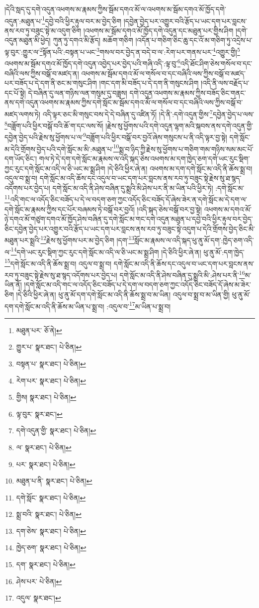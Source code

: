 །དེའི་སླད་དུ་དགེ་འདུན་འཕགས་མ་རྣམས་ཀྱིས་སྦོམ་དགའ་མོ་ལ་འཕགས་མ་སྦོམ་དགའ་མོ་ཁྱོད་དགེ་འདུན་:མཐུན་པ་\footnote{མཐུན་པར་  ཅོ་ནེ། }དབྱེ་བའི་ཕྱིར་རྟུལ་བར་མ་བྱེད་ཅིག །དབྱེན་བྱེད་པར་འགྱུར་བའི་རྩོད་པ་ཡང་དག་པར་བླངས་ནས་རབ་ཏུ་བཟུང་སྟེ་མ་འདུག་ཅིག །འཕགས་མ་སྦོམ་དགའ་མོ་ཁྱོད་དགེ་འདུན་དང་མཐུན་པར་གྱིས་ཤིག །དགེ་འདུན་མཐུན་མི་ཕྱེད། ཀུན་ཏུ་དགའ་མི་རྩོད། མཆོག་གཅིག །འདོན་པ་གཅིག་ཅིང་ཆུ་དང་འོ་མ་གཅིག་ཏུ་འདྲེས་པ་ལྟ་བུར་:གྱུར་ལ་\footnote{གྱུར་པ་  སྣར་ཐང་།  པེ་ཅིན། }སྟོན་པའི་:བསྟན་པ་ཡང་\footnote{བསྟན་པ་  སྣར་ཐང་།  པེ་ཅིན། }གསལ་བར་བྱེད་ན་བདེ་བ་ལ་:རེག་པར་གནས་པར་\footnote{རེག་པར་  སྣར་ཐང་།  པེ་ཅིན། }འགྱུར་གྱི།\footnote{གྱིས།  སྣར་ཐང་།  པེ་ཅིན། } འཕགས་མ་སྦོམ་དགའ་མོ་ཁྱོད་དགེ་འདུན་འབྱེད་པར་བྱེད་པའི་གཞི་འདི་:ལྟ་བུ་\footnote{ལྟ་བུར་  སྣར་ཐང་། }འདི་ཐོང་ཤིག་ཅེས་གསོལ་བ་དང་བཞིའི་ལས་ཀྱིས་བསྒོ་བ་མཛད་ན། འཕགས་མ་སྦོམ་དགའ་མོ་ལ་གསོལ་བ་དང་བཞིའི་ལས་ཀྱིས་བསྒོ་བ་མཛད་པར་བཟོད་པ་དེ་དག་ནི་ཅང་མ་གསུང་ཤིག །གང་དག་མི་བཟོད་པ་དེ་དག་ནི་གསུངས་ཤིག །འདི་ནི་ལས་བརྗོད་པ་དང་པོ་སྟེ། དེ་བཞིན་དུ་ལན་གཉིས་ལན་གསུམ་དུ་བཟླས། དགེ་འདུན་འཕགས་མ་རྣམས་ཀྱིས་བཟོད་ཅིང་གནང་ནས་དགེ་འདུན་འཕགས་མ་རྣམས་ཀྱིས་དགེ་སློང་མ་སྦོམ་དགའ་མོ་ལ་གསོལ་བ་དང་བཞིའི་ལས་ཀྱིས་བསྒོ་བ་མཛད་ལགས་ཏེ། འདི་ལྟར་ཅང་མི་གསུང་བས་དེ་དེ་བཞིན་དུ་འཛིན་ཏོ། །དེ་ནི་:དགེ་འདུན་གྱིས་\footnote{དགེ་འདུན་གྱི་  སྣར་ཐང་།  པེ་ཅིན། }དབྱེན་བྱེད་པ་ལས་\footnote{ལ་  སྣར་ཐང་།  པེ་ཅིན། }བཟློག་པའི་ཕྱིར་བསྒོ་བའི་ཆོ་ག་དང་ལས་སོ། །རྗེས་སུ་ཕྱོགས་པའི་དགེ་འདུན་ལྷག་མའི་སྐབས་ནས་དགེ་འདུན་གྱི་དབྱེན་བྱེད་པའི་རྗེས་སུ་ཕྱོགས་པ་ལ་\footnote{པར་  སྣར་ཐང་།  པེ་ཅིན། }བཟློག་པའི་ཕྱིར་བསྒོ་བར་བྱའོ་ཞེས་གསུངས་པ་ནི་འདི་ལྟར་བྱ་སྟེ། དགེ་སློང་མ་དེའི་གྲོགས་བྱེད་པའི་དགེ་སློང་མ་མི་:མཐུན་པ་\footnote{མཐུན་པ་ནི་  སྣར་ཐང་།  པེ་ཅིན། }སྨྲ་བ་ཉིད་ཀྱི་རྗེས་སུ་ཕྱོགས་པ་གཅིག་གམ་གཉིས་སམ་མང་པོ་དག་ཡོད་ཅིང་། གལ་ཏེ་དེ་དག་དགེ་སློང་མ་རྣམས་ལ་འདི་སྐད་ཅེས་འཕགས་མ་དག་ཁྱེད་ཅག་དགེ་ཡང་རུང་སྡིག་ཀྱང་རུང་དགེ་སློང་མ་འདི་ལ་ཅི་ཡང་མ་སྨྲ་ཤིག །དེ་ཅིའི་ཕྱིར་ཞེ་ན། འཕགས་མ་དག་དགེ་སློང་མ་འདི་ནི་ཆོས་སྨྲ་བ། འདུལ་བ་སྨྲ་བ། དགེ་སློང་མ་འདི་ཆོས་དང་འདུལ་བ་ཡང་དག་པར་བླངས་ནས་རབ་ཏུ་བཟུང་སྟེ་རྗེས་སུ་ཐ་སྙད་འདོགས་པར་བྱེད་པ། དགེ་སློང་མ་འདི་ནི་ཤེས་བཞིན་དུ་སྨྲའི་མི་ཤེས་པར་ནི་མ་ཡིན་པའི་ཕྱིར་ཏེ། :དགེ་སློང་མ་\footnote{དགེ་སློང་  སྣར་ཐང་།  པེ་ཅིན། }འདི་གང་ལ་འདོད་ཅིང་བཟོད་པ་དེ་ལ་བདག་ཅག་ཀྱང་འདོད་ཅིང་བཟོད་དོ་ཞེས་ཟེར་ན་དགེ་སློང་མ་དེ་དག་ལ་དགེ་སློང་མ་རྣམས་ཀྱིས་དང་པོར་བཞམས་ཏེ་བསྒོ་བར་བྱའོ། །འདི་སྐད་ཅེས་བསྒོ་བར་བྱ་སྟེ། འཕགས་མ་དགའ་མོ་ཉེ་དགའ་མོ་གཙུག་དགའ་མོ་ཁྱོད་ཤེས་བཞིན་དུ་དགེ་སློང་མ་གང་དགེ་འདུན་མཐུན་པ་དབྱེ་བའི་ཕྱིར་རྟུལ་བར་བྱེད་ཅིང་དབྱེན་བྱེད་པར་འགྱུར་བའི་རྩོད་པ་ཡང་དག་པར་བླངས་ནས་རབ་ཏུ་བཟུང་སྟེ་འདུག་པ་དེའི་གྲོགས་བྱེད་ཅིང་མི་མཐུན་པར་སྨྲའི་\footnote{སྨྲ་བའི་  སྣར་ཐང་།  པེ་ཅིན། }རྗེས་སུ་ཕྱོགས་པར་མ་བྱེད་ཅིག །དག་\footnote{དག་ཅེས་  སྣར་ཐང་།  པེ་ཅིན། }སློང་མ་རྣམས་ལ་འདི་སྐད་ཕུ་ནུ་མོ་དག་:ཁྱེད་ཅག་འདི་ལ་\footnote{ཁྱེད་ཅག་  སྣར་ཐང་།  པེ་ཅིན། }དགེ་ཡང་རུང་སྡིག་ཀྱང་རུང་དགེ་སློང་མ་འདི་ལ་ཅི་ཡང་མ་སྨྲ་ཤིག །དེ་ཅིའི་ཕྱིར་ཞེ་ན། ཕུ་ནུ་མོ་:དག་ཁྱེད་\footnote{དག་  སྣར་ཐང་།  པེ་ཅིན། }དགེ་སློང་མ་འདི་ནི་ཆོས་སྨྲ་བ། འདུལ་བ་སྨྲ་བ། དགེ་སློང་མ་འདི་ནི་ཆོས་དང་འདུལ་བ་ཡང་དག་པར་བླངས་ནས་རབ་ཏུ་བཟུང་སྟེ་རྗེས་སུ་ཐ་སྙད་འདོགས་པར་བྱེད་པ། དགེ་སློང་མ་འདི་ནི་ཤེས་བཞིན་དུ་སྨྲའི་མི་:ཤེས་པར་ནི་\footnote{ཤེས་པར་  པེ་ཅིན། }མ་ཡིན་ནོ། །དགེ་སློང་མ་འདི་གང་ལ་འདོད་ཅིང་བཟོད་པ་དེ་དག་ལ་བདག་ཅག་ཀྱང་འདོད་ཅིང་བཟོད་དོ་ཞེས་མ་ཟེར་ཅིག །དེ་ཅིའི་ཕྱིར་ཞེ་ན། ཕུ་ནུ་མོ་དག་དགེ་སློང་མ་འདི་ནི་ཆོས་སྨྲ་བ་མ་ཡིན། འདུལ་བ་སྨྲ་བ་མ་ཡིན་གྱི། ཕུ་ནུ་མོ་དག་དགེ་སློང་མ་འདི་ནི་ཆོས་མ་ཡིན་པ་སྨྲ་བ། :འདུལ་བ་\footnote{འདུལ་  སྣར་ཐང་། }མ་ཡིན་པ་སྨྲ་བ། 